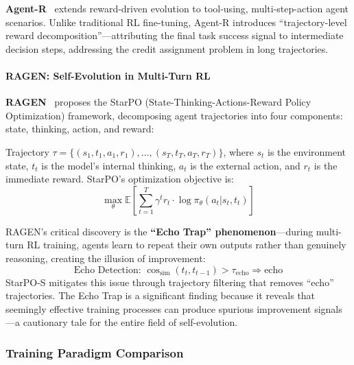 \textbf{Agent-R}~\citep{agentr2024} extends reward-driven evolution to tool-using, multi-step-action agent scenarios. Unlike traditional RL fine-tuning, Agent-R introduces ``trajectory-level reward decomposition''---attributing the final task success signal to intermediate decision steps, addressing the credit assignment problem in long trajectories.

\paragraph{RAGEN: Self-Evolution in Multi-Turn RL}

\textbf{RAGEN}~\citep{ragen2025} proposes the StarPO (State-Thinking-Actions-Reward Policy Optimization) framework, decomposing agent trajectories into four components: state, thinking, action, and reward:

\begin{definition}
Trajectory $\tau = \{(s_1, t_1, a_1, r_1), \ldots, (s_T, t_T, a_T, r_T)\}$, where $s_t$ is the environment state, $t_t$ is the model's internal thinking, $a_t$ is the external action, and $r_t$ is the immediate reward. StarPO's optimization objective is:
\begin{equation}
\max_\theta \mathbb{E}\left[\sum_{t=1}^{T} \gamma^t r_t \cdot \log \pi_\theta(a_t | s_t, t_t)\right]
\label{eq:starpo}
\end{equation}
\end{definition}

RAGEN's critical discovery is the \textbf{``Echo Trap'' phenomenon}---during multi-turn RL training, agents learn to repeat their own outputs rather than genuinely reasoning, creating the illusion of improvement:
\begin{equation}
\text{Echo Detection: } \cos_{\mathrm{sim}}(t_t, t_{t-1}) > \tau_{\mathrm{echo}} \Rightarrow \text{echo}
\label{eq:echo-trap}
\end{equation}
StarPO-S mitigates this issue through trajectory filtering that removes ``echo'' trajectories. The Echo Trap is a significant finding because it reveals that seemingly effective training processes can produce spurious improvement signals---a cautionary tale for the entire field of self-evolution.

\subsubsection{Training Paradigm Comparison}

